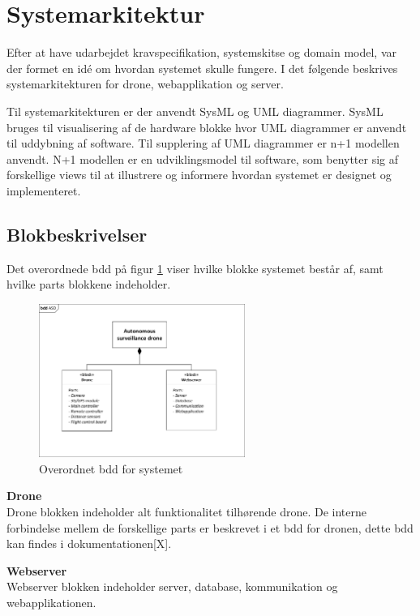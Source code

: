 \section{Systemarkitektur}
\label{chap:systemarkitektur}

Efter at have udarbejdet kravspecifikation, systemskitse og domain model, var der formet en idé om hvordan systemet skulle fungere. 
I det følgende beskrives systemarkitekturen for drone, webapplikation og server. 

Til systemarkitekturen er der anvendt SysML og UML diagrammer. SysML bruges til visualisering af de hardware blokke hvor UML diagrammer er anvendt til uddybning af software. Til supplering af UML diagrammer er n+1 modellen anvendt. N+1 modellen er en udviklingsmodel til software, som benytter sig af forskellige views til at illustrere og informere hvordan systemet er designet og implementeret.
 
\subsection{Blokbeskrivelser}
Det overordnede bdd på figur \ref{fig:bdd_asd} viser hvilke blokke systemet består af, samt hvilke parts blokkene indeholder.

\begin{figure}[H]
	\centering
	\includegraphics[width=0.60\textwidth]{Billeder/Projektbeskrivelse/bdd_overordnet.pdf}
	\caption{Overordnet bdd for systemet}
	\label{fig:bdd_asd}
\end{figure}

\textbf{Drone} \\
Drone blokken indeholder alt funktionalitet tilhørende drone. De interne forbindelse mellem de forskellige parts er beskrevet i et bdd for dronen, dette bdd kan findes i dokumentationen[X].

\textbf{Webserver} \\
Webserver blokken indeholder server, database, kommunikation og webapplikationen.

